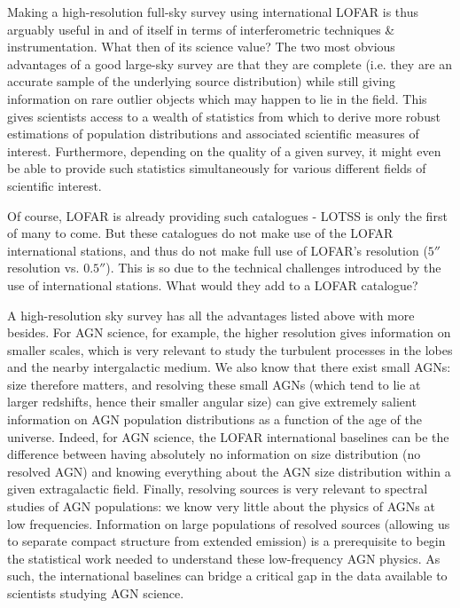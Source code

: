 \pg
Making a high-resolution full-sky survey using international LOFAR is thus arguably useful in and of itself in terms of interferometric techniques \& instrumentation. What then of its science value? The two most obvious advantages of a good large-sky survey are that they are complete (i.e. they are an accurate sample of the underlying source distribution) while still giving information on rare outlier objects which may happen to lie in the field. This gives scientists access to a wealth of statistics from which to derive more robust estimations of population distributions and associated scientific measures of interest. Furthermore, depending on the quality of a given survey, it might even be able to provide such statistics simultaneously for various different fields of scientific interest.

\pg
Of course, LOFAR is already providing such catalogues - LOTSS   is only the first of many to come. But these catalogues do not make use of the LOFAR international stations, and thus do not make full use of LOFAR's resolution ($5''$ resolution vs. $0.5''$).  This is so due to the technical challenges introduced by the use of international stations. What would they add to a LOFAR catalogue?

\pg
A high-resolution sky survey has all the advantages listed above with more besides. For AGN science, for example, the higher resolution gives information on smaller scales, which is very relevant to study the turbulent processes in the lobes and the nearby intergalactic medium. We also know that there exist small AGNs: size therefore matters, and resolving these small AGNs (which tend to lie at larger redshifts, hence their smaller angular size) can give extremely salient information on AGN population distributions as a function of the age of the universe. Indeed, for AGN science, the LOFAR international baselines can be the difference between having absolutely no information on size distribution (no resolved AGN) and knowing everything about the AGN size distribution within a given extragalactic field. Finally, resolving sources is very relevant to spectral studies of AGN populations: we know very little about the physics of AGNs at low frequencies. Information on large populations of resolved sources (allowing us to separate compact structure from extended emission) is a prerequisite to begin the statistical work needed to understand these low-frequency AGN physics. As such, the international baselines can bridge a critical gap in the data available to scientists studying AGN science.

